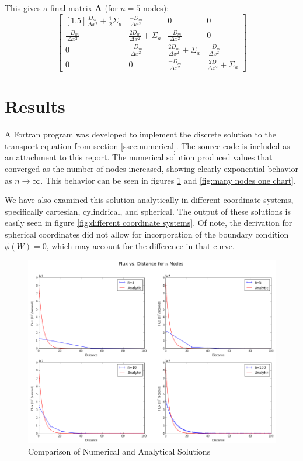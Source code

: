 \documentclass[10pt,peerreviewca]{IEEEtran} %
\newcommand{\opmat}[1]{\mathbf{#1}}
\begin{document}
	This gives a final matrix $\opmat{A}$ (for $n=5$ nodes):
	\[
	\begin{bmatrix}[1.5]
		\frac{D_m}{\Delta x^2} + \frac{1}{2}\Sigma_a & \frac{-D_m}{\Delta x^2} & 0 & 0 \\
		\frac{-D_m}{\Delta x^2} & \frac{2D_m}{\Delta x^2} + \Sigma_a & \frac{-D_m}{\Delta x^2} & 0 \\
		0 & \frac{-D_m}{\Delta x^2} & \frac{2D_m}{\Delta x^2} + \Sigma_a & \frac{-D_m}{\Delta x^2} \\
		0 & 0 & \frac{-D_m}{\Delta x^2} & \frac{2D}{\Delta x^2} + \Sigma_a
	\end{bmatrix}
	\]

	\section{Results}
	A Fortran program was developed to implement the discrete solution to the transport equation from section \ref{ssec:numerical}. The source code is included as an attachment to this report. The numerical solution produced values that converged as the number of nodes increased, showing clearly exponential behavior as $n\rightarrow\infty$. This behavior can be seen in figures \ref{fig:numerical_vs_analytical} and \ref{fig:many nodes one chart}. 

	We have also examined this solution analytically in different coordinate systems, specifically cartesian, cylindrical, and spherical. The output of these solutions is easily seen in figure \ref{fig:different coordinate systems}. Of note, the derivation for spherical coordinates did not allow for incorporation of the boundary condition $\phi(W)=0$, which may account for the difference in that curve.

	\begin{figure}
		\includegraphics[width=7in]{analytic_vs_numerical}
		\caption{Comparison of Numerical and Analytical Solutions}
		\label{fig:numerical_vs_analytical}
	\end{figure}
\end{document}
